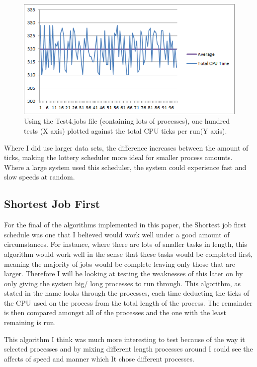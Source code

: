 \documentclass{sig-alternate}
\begin{document}
\begin{figure}[!h]
\centering
\includegraphics[scale=0.6]{images/lottery2.png}
\caption{Using the Test4.jobs file (containing lots of processes), one hundred
tests (X axis) plotted against the total CPU ticks per run(Y axis).}
\end{figure}

Where I did use larger data sets, the difference increases between the amount of
ticks, making the lottery scheduler more ideal for smaller process amounts.
Where a large system used this scheduler, the system could experience fast and
slow speeds at random.

\subsection{Shortest Job First}
For the final of the algorithms implemented in this paper, the Shortest job
first schedule was one that I believed would work well under a good amount of
circumstances. For instance, where there are lots of smaller tasks in length,
this algorithm would work well in the sense that these tasks would be completed
first, meaning the majority of jobs would be complete leaving only those that
are larger. Therefore I will be looking at testing the weaknesses of this later
on by only giving the system big/ long processes to run through. This algorithm,
as stated in the name looks through the processes, each time deducting the ticks
of the CPU used on the process from the total length of the process. The
remainder is then compared amongst all of the processes and the one with the
least remaining is run. 

This algorithm I think was much more interesting to test because of the way it
selected processes and by mixing different length processes around I could see
the affects of speed and manner which It chose different processes.
\end{document}
